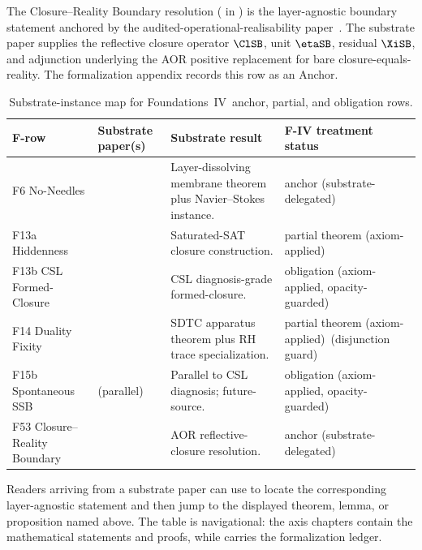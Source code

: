 \documentclass[11pt]{article}
\newcommand{\FIV}{Foundations~IV}
\newcommand{\statPartial}{partial theorem (axiom-applied)}
\newcommand{\statObligation}{obligation (axiom-applied, opacity-guarded)}
\newcommand{\statAnchor}{anchor (substrate-delegated)}
\newcommand{\PaperAOR}{the audited-operational-realisability paper}
\theoremstyle{definition}
\begin{document}
The Closure--Reality Boundary resolution ( in
) is the layer-agnostic
boundary statement anchored by \PaperAOR\ \citep{Tsiokos2026AOR}. The
substrate paper supplies the reflective closure operator \(\ClSB\), unit
\(\etaSB\), residual \(\XiSB\), and adjunction underlying the AOR
positive replacement for bare closure-equals-reality. The formalization
appendix records this row as an Anchor.

\begin{table}[t]
  \centering
  \footnotesize
  \begin{tabularx}{\textwidth}{@{}
      >{\raggedright\arraybackslash}p{}
      >{\raggedright\arraybackslash}p{}
      >{\raggedright\arraybackslash}X
      >{\raggedright\arraybackslash}p{}@{}}
    \toprule
    F-row & Substrate paper(s) & Substrate result & F-IV treatment status \\
    \midrule
    F6 No-Needles &
    \citet{Tsiokos2026NeedleKiller, Tsiokos2026NavierStokes} &
    Layer-dissolving membrane theorem plus Navier--Stokes
    instance. &
    \statAnchor \\
    F13a Hiddenness &
    \citet{Tsiokos2026PvNP} &
    Saturated-SAT closure construction. &
    \statPartial \\
    F13b CSL Formed-Closure &
    \citet{Tsiokos2026CSL} &
    CSL diagnosis-grade formed-closure. &
    \statObligation \\
    F14 Duality Fixity &
    \citet{Tsiokos2026SDTC, Tsiokos2026RH} &
    SDTC apparatus theorem plus RH trace
    specialization. &
    \statPartial\ (disjunction guard) \\
    F15b Spontaneous SSB &
    \citet{Tsiokos2026CSL} (parallel) &
    Parallel to CSL diagnosis; future-source. &
    \statObligation \\
    F53 Closure--Reality Boundary &
    \citet{Tsiokos2026AOR} &
    AOR reflective-closure resolution. &
    \statAnchor \\
    \bottomrule
  \end{tabularx}
  \caption{Substrate-instance map for \FIV\ anchor, partial, and obligation rows.}
  \label{tab:substrate-instances}
\end{table}
 
Readers arriving from a substrate paper can use
 to locate the corresponding
layer-agnostic statement and then jump to the displayed theorem,
lemma, or proposition named above. The table is navigational: the axis
chapters contain the mathematical statements and proofs, while
 carries the formalization ledger.
\end{document}
